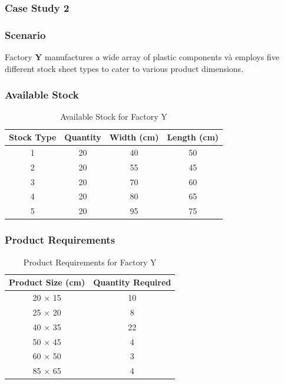\documentclass[a4paper]{article}
\begin{document}
\subsubsection{Case Study 2}

\subsubsection*{Scenario}
Factory \textbf{Y} manufactures a wide array of plastic components và employs five different stock sheet types to cater to various product dimensions.

\subsubsection*{Available Stock}
\begin{table}[H]
    \centering
    \caption{Available Stock for Factory Y}
    \begin{tabular}{|c|c|c|c|}
        \hline
        \textbf{Stock Type} & \textbf{Quantity} & \textbf{Width (cm)} & \textbf{Length (cm)} \\ \hline
        1 & 20 & 40 & 50 \\ \hline
        2 & 20 & 55 & 45 \\ \hline
        3 & 20 & 70 & 60 \\ \hline
        4 & 20 & 80 & 65 \\ \hline
        5 & 20 & 95 & 75 \\ \hline
    \end{tabular}
\end{table}

\subsubsection*{Product Requirements}
\begin{table}[H]
    \centering
    \caption{Product Requirements for Factory Y}
    \begin{tabular}{|c|c|}
        \hline
        \textbf{Product Size (cm)} & \textbf{Quantity Required} \\ \hline
        20 × 15 & 10 \\ \hline
        25 × 20 & 8 \\ \hline
        40 × 35 & 22 \\ \hline
        50 × 45 & 4 \\ \hline
        60 × 50 & 3 \\ \hline
        85 × 65 & 4 \\ \hline
    \end{tabular}
\end{table}
\end{document}
